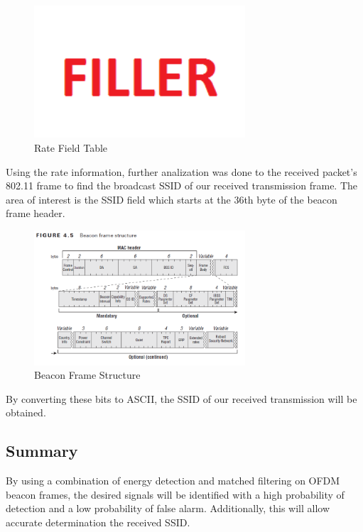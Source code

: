 \begin{figure}[ht!]
	\centering
	\includegraphics[width=0.70\textwidth]{img/filler}
	\caption{Rate Field Table}
	\label{fig:ofdm_rate_table}
\end{figure}\par
Using the rate information, further analization was done to the received packet’s 802.11 frame to find the broadcast SSID of our received transmission frame. The area of interest is the SSID field which starts at the 36th byte of the beacon frame header. 
\begin{figure}[ht!]
	\centering
	\includegraphics[width=0.70\textwidth]{img/beacon_frame}
	\caption{Beacon Frame Structure}
	\label{fig:beacon_frame}
\end{figure}\par
By converting these bits to ASCII, the SSID of our received transmission will be obtained.

\subsection{Summary}
By using a combination of energy detection and matched filtering on OFDM beacon frames,  the desired signals will be identified  with a high probability of detection and a low probability of false alarm. Additionally, this will allow accurate determination the received SSID.

